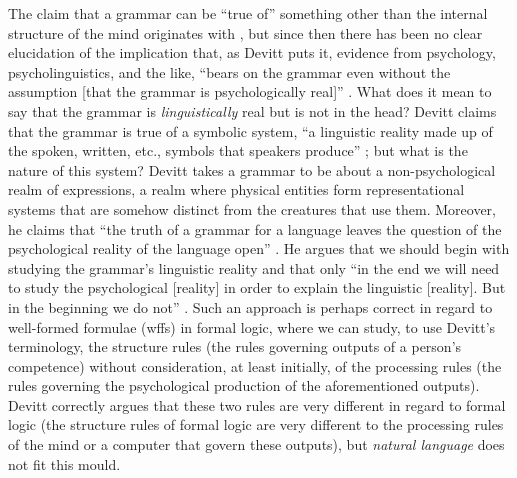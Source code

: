 The claim that a grammar can be “true of” something other than the internal structure of the mind originates with \citet{Stich1972}, but since then there has been no clear elucidation of the implication that, as Devitt puts it, evidence from psychology, psycholinguistics, and the like, “bears on the grammar even without the assumption [that the grammar is psychologically real]” \citep[128, fn. 28]{Devitt2003}. What does it mean to say that the grammar is \textit{linguistically} real but is not in the head? Devitt claims that the grammar is true of a symbolic system, “a linguistic reality made up of the spoken, written, etc., symbols that speakers produce” \citep[483, fn. 5]{Devitt2006a}; but what is the nature of this system? Devitt takes a grammar to be about a non-psychological realm of expressions, a realm where physical entities form representational systems that are somehow distinct from the creatures that use them. Moreover, he claims that “the truth of a grammar for a language leaves the question of the psychological reality of the language open” \citep[136]{Devitt2003}. He argues that we should begin with studying the grammar’s linguistic reality and that only “in the end we will need to study the psychological [reality] in order to explain the linguistic [reality]. But in the beginning we do not” \citep[135]{Devitt2003}. Such an approach is perhaps correct in regard to well-formed formulae (wffs) in formal logic, where we can study, to use Devitt’s terminology, the structure rules (the rules governing outputs of a person’s competence) without consideration, at least initially, of the processing rules (the rules governing the psychological production of the aforementioned outputs). Devitt correctly argues that these two rules are very different in regard to formal logic (the structure rules of formal logic are very different to the processing rules of the mind or a computer that govern these outputs), but \textit{natural language} does not fit this mould. 

